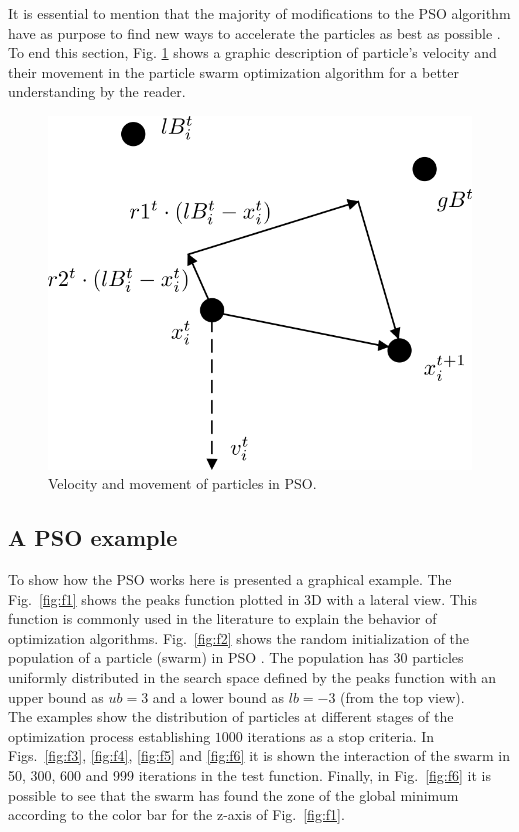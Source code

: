 It is essential to mention that the majority of modifications to the PSO algorithm have as purpose to find new ways to accelerate the particles as best as possible \cite{erick2016optimizacion}. To end this section, Fig. \ref{fig:PSOmovement} shows a graphic description of particle's velocity and their movement in the particle swarm optimization algorithm for a better understanding by the reader.\\

\begin{figure}[h!]
\centering
\includegraphics[scale=0.4]{Part 2 - Search-Based Optimization/Particle Swarm Optimization/Images/Fig.1.3.png}
\caption{Velocity and movement of particles in PSO.}
\label{fig:PSOmovement}
\end{figure}

\subsection{A PSO example}

To show how the PSO works here is presented a graphical example. The Fig.~\ref{fig:f1} shows the peaks function plotted in 3D with a lateral view. This function is commonly used in the literature to explain the behavior of optimization algorithms. Fig.~\ref{fig:f2} shows the random initialization of the population of a particle (swarm) in PSO \cite{kennedy1995particle}. The population has 30 particles uniformly distributed in the search space defined by the peaks function with an upper bound as $ub=3$ and a lower bound as $lb=-3$ (from the top view).\\
The examples show the distribution of particles at different stages of the optimization process establishing $1000$ iterations as a stop criteria. In Figs.~\ref{fig:f3}, \ref{fig:f4}, \ref{fig:f5} and \ref{fig:f6} it is shown the interaction of the swarm in 50, 300, 600 and 999 iterations in the test function. Finally, in Fig.~\ref{fig:f6} it is possible to see that the swarm has found the zone of the global minimum according to the color bar for the z-axis of Fig.~\ref{fig:f1}.

